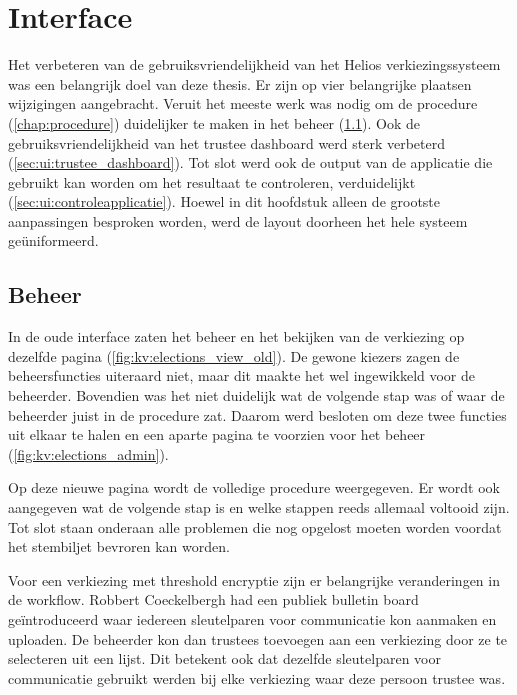 % 
%

\chapter{Interface}
\label{chap:interface}

Het verbeteren van de gebruiksvriendelijkheid van het Helios verkiezingssysteem was een belangrijk doel van deze thesis. Er zijn op vier belangrijke plaatsen wijzigingen aangebracht. Veruit het meeste werk was nodig om de procedure (\ref{chap:procedure}) duidelijker te maken in het beheer (\ref{sec:ui:beheer}). Ook de gebruiksvriendelijkheid van het trustee dashboard werd sterk verbeterd (\ref{sec:ui:trustee_dashboard}). Tot slot werd ook de output van de applicatie die gebruikt kan worden om het resultaat te controleren, verduidelijkt (\ref{sec:ui:controleapplicatie}). Hoewel in dit hoofdstuk alleen de grootste aanpassingen besproken worden, werd de layout doorheen het hele systeem geüniformeerd.

\section{Beheer}
\label{sec:ui:beheer}

In de oude interface zaten het beheer en het bekijken van de verkiezing op dezelfde pagina (\ref{fig:kv:elections_view_old}). De gewone kiezers zagen de beheersfuncties uiteraard niet, maar dit maakte het wel ingewikkeld voor de beheerder. Bovendien was het niet duidelijk wat de volgende stap was of waar de beheerder juist in de procedure zat. Daarom werd besloten om deze twee functies uit elkaar te halen en een aparte pagina te voorzien voor het beheer (\ref{fig:kv:elections_admin}).

\npar Op deze nieuwe pagina wordt de volledige procedure weergegeven. Er wordt ook aangegeven wat de volgende stap is en welke stappen reeds allemaal voltooid zijn. Tot slot staan onderaan alle problemen die nog opgelost moeten worden voordat het stembiljet bevroren kan worden.


\npar Voor een verkiezing met threshold encryptie zijn er belangrijke veranderingen in de workflow. Robbert Coeckelbergh had een publiek bulletin board ge\"introduceerd waar iedereen sleutelparen voor communicatie kon aanmaken en uploaden. De beheerder kon dan trustees toevoegen aan een verkiezing door ze te selecteren uit een lijst. Dit betekent ook dat dezelfde sleutelparen voor communicatie gebruikt werden bij elke verkiezing waar deze persoon trustee was.

